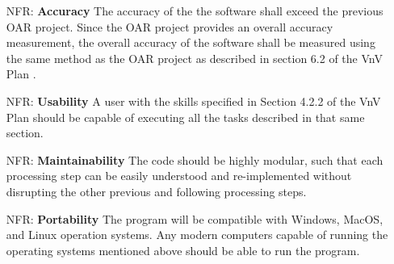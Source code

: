 \documentclass[12pt]{article}
\newcounter{nfrnum} %
\begin{document}
\noindent \begin{itemize}

\item[NFR\refstepcounter{nfrnum}\thenfrnum \label{NFR_Accuracy}:]
  \textbf{Accuracy} The accuracy of the the software shall exceed the previous
  OAR project. Since the OAR project provides an overall accuracy measurement,
  the overall accuracy of the \progname{} software shall be measured using the
  same method as the OAR project as described in section 6.2 of the VnV Plan
  \citep{VnV}.
  

\item[NFR\refstepcounter{nfrnum}\thenfrnum \label{NFR_Usability}:] \textbf{Usability} A user with the skills specified in Section 4.2.2 of the VnV Plan should be capable of executing all the tasks described in that same section. \citep{VnV}


\item[NFR\refstepcounter{nfrnum}\thenfrnum \label{NFR_Maintainability}:]
  \textbf{Maintainability} 
  The code should be highly modular, such that each processing step can be easily
  understood and re-implemented without disrupting the other previous and
  following processing steps.


\item[NFR\refstepcounter{nfrnum}\thenfrnum \label{NFR_Portability}:]
  \textbf{Portability} The program will be compatible with Windows, MacOS, and
  Linux operation systems. Any modern computers capable of running the operating
  systems mentioned above should be able to run the program.


\end{itemize}
\end{document}
